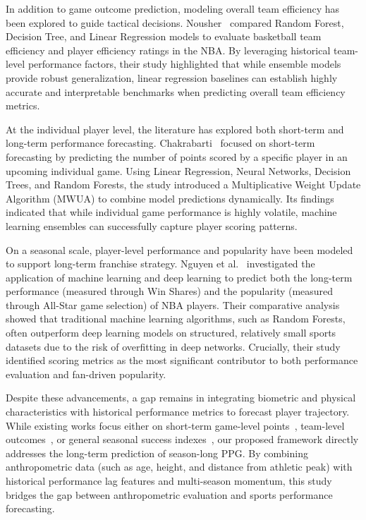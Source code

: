 \documentclass[conference]{IEEEtran}
\begin{document}
In addition to game outcome prediction, modeling overall team efficiency has been explored to guide tactical decisions. Nousher~\cite{Nousher} compared Random Forest, Decision Tree, and Linear Regression models to evaluate basketball team efficiency and player efficiency ratings in the NBA. By leveraging historical team-level performance factors, their study highlighted that while ensemble models provide robust generalization, linear regression baselines can establish highly accurate and interpretable benchmarks when predicting overall team efficiency metrics. 

At the individual player level, the literature has explored both short-term and long-term performance forecasting. Chakrabarti~\cite{Chakrabarti} focused on short-term forecasting by predicting the number of points scored by a specific player in an upcoming individual game. Using Linear Regression, Neural Networks, Decision Trees, and Random Forests, the study introduced a Multiplicative Weight Update Algorithm (MWUA) to combine model predictions dynamically. Its findings indicated that while individual game performance is highly volatile, machine learning ensembles can successfully capture player scoring patterns.

On a seasonal scale, player-level performance and popularity have been modeled to support long-term franchise strategy. Nguyen et al.~\cite{Nguyen} investigated the application of machine learning and deep learning to predict both the long-term performance (measured through Win Shares) and the popularity (measured through All-Star game selection) of NBA players. Their comparative analysis showed that traditional machine learning algorithms, such as Random Forests, often outperform deep learning models on structured, relatively small sports datasets due to the risk of overfitting in deep networks. Crucially, their study identified scoring metrics as the most significant contributor to both performance evaluation and fan-driven popularity.

Despite these advancements, a gap remains in integrating biometric and physical characteristics with historical performance metrics to forecast player trajectory. While existing works focus either on short-term game-level points~\cite{Chakrabarti}, team-level outcomes~\cite{Panagiotis}, or general seasonal success indexes~\cite{Nguyen}, our proposed framework directly addresses the long-term prediction of season-long PPG. By combining anthropometric data (such as age, height, and distance from athletic peak) with historical performance lag features and multi-season momentum, this study bridges the gap between anthropometric evaluation and sports performance forecasting.
\end{document}
